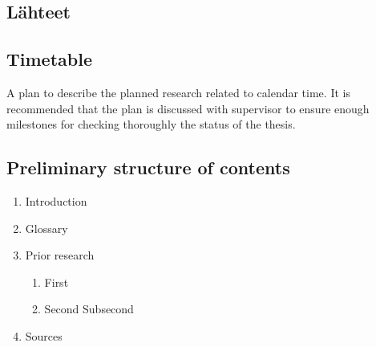 \documentclass[a4paper,12pt]{article}
\begin{document}
\begin{appendices}
\begin{refsection}
		\subsection*{Lähteet}
		\printbibliography[heading=none]
	\end{refsection}
	
	\subsection*{Timetable }
	A plan to describe the planned research related to calendar time. It is recommended that 
	the  plan  is  discussed  with  supervisor  to  ensure  enough  milestones  for  checking 
	thoroughly the status of the thesis.
	
	\subsection*{Preliminary structure of contents }
	\begin{enumerate}
		\item Introduction
		\item Glossary
		\item Prior research
		\begin{enumerate} 
			\item First
			\item Second
			\subitem Subsecond
		\end{enumerate}		
		\item Sources
	\end{enumerate}
	
\end{appendices}
\end{document}
